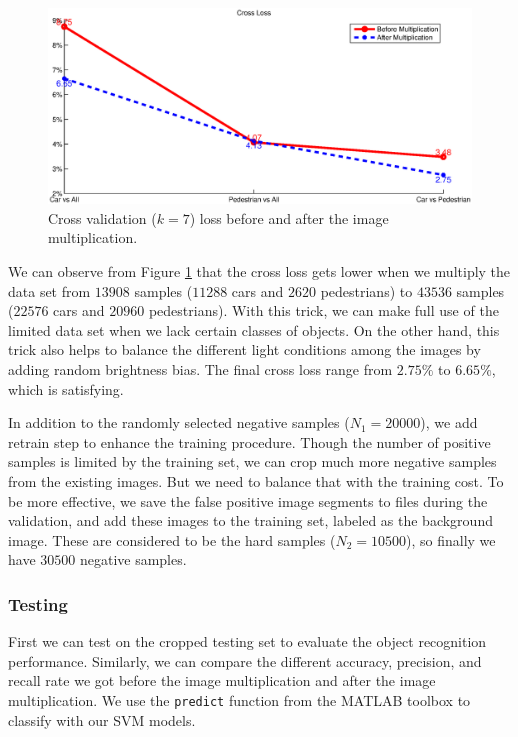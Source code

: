 \documentclass{article} %
\begin{document}
\begin{figure}[htb]
\begin{center}
\includegraphics[width=.8\textwidth]{crossloss.eps}
\end{center}
\caption{Cross validation ($k=7$) loss before and after the image multiplication.
\label{fig:crossloss}}
\end{figure}


We can observe from Figure \ref{fig:crossloss} that the cross loss gets lower when we multiply the data set from $13908$ samples ($11288$ cars and $2620$ pedestrians) to $43536$ samples ($22576$ cars and $20960$ pedestrians). With this trick, we can make full use of the limited data set when we lack certain classes of objects. On the other hand, this trick also helps to balance the different light conditions among the images by adding random brightness bias. The final cross loss range from $2.75\%$ to $6.65\%$, which is satisfying. 

In addition to the randomly selected negative samples ($N_1=20000$), we add retrain step to enhance the training procedure. Though the number of positive samples is limited by the training set, we can crop much more negative samples from the existing images. But we need to balance that with the training cost. To be more effective, we save the false positive image segments to files during the validation, and add these images to the training set, labeled as the background image. These are considered to be the hard samples ($N_2=10500$), so finally we have $30500$ negative samples.


\subsubsection{Testing}
\label{sec:test}

First we can test on the cropped testing set to evaluate the object recognition performance. Similarly, we can compare the different accuracy, precision, and recall rate we got before the image multiplication and after the image multiplication. We use the \texttt{predict} function from the MATLAB toolbox to classify with our SVM models.
\end{document}
